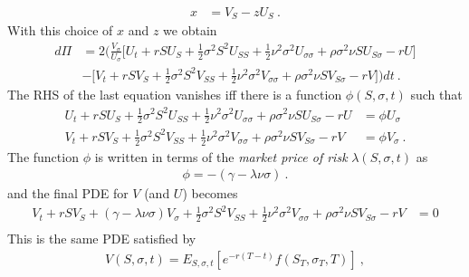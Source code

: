 \documentclass[10pt]{article}
\numberwithin{equation}{section}
\begin{document}
\begin{equation*}
	\begin{split}
		x &= V_S - z U_S \:.
	\end{split}
\end{equation*}
With this choice of $x$ and $z$ we obtain
\begin{equation*}
	\begin{split}
	d\Pi &= 2 \biggl(\frac{V_{\sigma}}{U_{\sigma}}\biggl[U_t + r S U_S + \frac{1}{2} \sigma^2 S^2 U_{SS}+ \frac{1}{2} \nu^2 \sigma^2 U_{\sigma\sigma}  + \rho \sigma^2 \nu S U_{S\sigma} - r U\biggr] \\
	& -\biggl[ V_t + r S V_S + \frac{1}{2} \sigma^2 S^2 V_{SS} + \frac{1}{2} \nu^2 \sigma^2 V_{\sigma\sigma} + \rho \sigma^2 \nu S V_{S\sigma} - r V \biggr] \biggr)dt\:.
	\end{split}
\end{equation*}
The RHS of the last equation vanishes iff there is a function $\phi(S,\sigma,t)$ such that
\begin{equation*}
	\begin{split}
	U_t + r S U_S + \frac{1}{2} \sigma^2 S^2 U_{SS}+ \frac{1}{2} \nu^2 \sigma^2 U_{\sigma\sigma}  + \rho \sigma^2 \nu S U_{S\sigma} - r U&=\phi U_{\sigma}\\
	V_t + r S V_S + \frac{1}{2} \sigma^2 S^2 V_{SS}+ \frac{1}{2} \nu^2 \sigma^2 V_{\sigma\sigma}  + \rho \sigma^2 \nu S V_{S\sigma} - r V &=\phi V_{\sigma}\:.
	\end{split}
\end{equation*}
The function $\phi$ is written in terms of the \emph{market price of risk} $\lambda(S,\sigma,t)$ as
\begin{equation*}
	\begin{split}
	\phi =- (\gamma-\lambda \nu \sigma)\:.
	\end{split}
\end{equation*}
and the final PDE for $V$ (and $U$) becomes
\begin{equation*}
	\begin{split}
	V_t + r S V_S +(\gamma- \lambda \nu \sigma) V_{\sigma}+ \frac{1}{2} \sigma^2 S^2 V_{SS}+ \frac{1}{2} \nu^2 \sigma^2 V_{\sigma\sigma}  + \rho \sigma^2 \nu S V_{S\sigma} - r V&=0\\
	\end{split}
\end{equation*}
This is the same PDE satisfied by
\begin{equation*}
	\begin{split}
	V(S,\sigma,t) = E_{S,\sigma,t} [e^{-r(T-t)} f(S_T,\sigma_T,T)] \:,
	\end{split}
\end{equation*}
\end{document}
